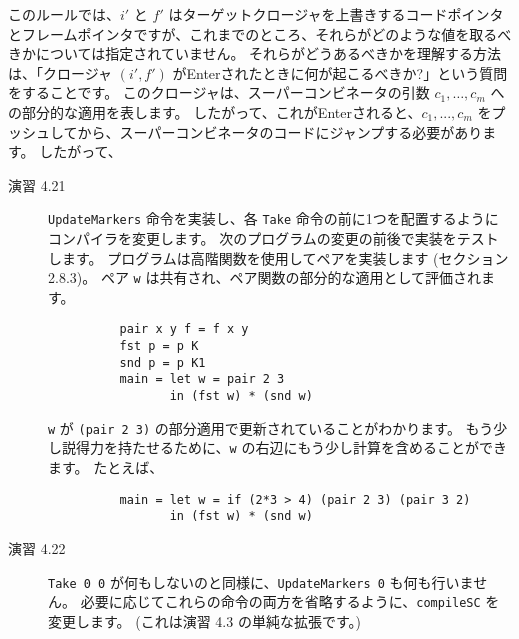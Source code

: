 \documentclass{jarticle}
\begin{document}
このルールでは、$i'$ と $f'$ はターゲットクロージャを上書きするコードポインタとフレームポインタですが、これまでのところ、それらがどのような値を取るべきかについては指定されていません。
それらがどうあるべきかを理解する方法は、「クロージャ $(i', f')$ がEnterされたときに何が起こるべきか?」という質問をすることです。
このクロージャは、スーパーコンビネータの引数 $c_1, \ldots, c_m$ への部分的な適用を表します。
したがって、これがEnterされると、$c_1, ..., c_m$ をプッシュしてから、スーパーコンビネータのコードにジャンプする必要があります。
したがって、


\begin{description}
	\item[演習 4.21] \texttt{UpdateMarkers} 命令を実装し、各 \texttt{Take} 命令の前に1つを配置するようにコンパイラを変更します。
		次のプログラムの変更の前後で実装をテストします。
		プログラムは高階関数を使用してペアを実装します (セクション 2.8.3)。
		ペア \texttt{w} は共有され、ペア関数の部分的な適用として評価されます。
		\begin{verbatim}
          pair x y f = f x y
          fst p = p K
          snd p = p K1
          main = let w = pair 2 3
                 in (fst w) * (snd w)
        \end{verbatim}
		\texttt{w} が \texttt{(pair 2 3)} の部分適用で更新されていることがわかります。
		もう少し説得力を持たせるために、\texttt{w} の右辺にもう少し計算を含めることができます。
		たとえば、
		\begin{verbatim}
          main = let w = if (2*3 > 4) (pair 2 3) (pair 3 2)
                 in (fst w) * (snd w)
        \end{verbatim}
	\item[演習 4.22] \texttt{Take 0 0} が何もしないのと同様に、\texttt{UpdateMarkers 0} も何も行いません。
		必要に応じてこれらの命令の両方を省略するように、\texttt{compileSC} を変更します。
		(これは演習 4.3 の単純な拡張です。)
\end{description}
\end{document}

